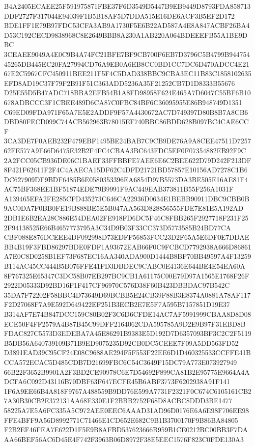 \documentclass[UTF8,fontset=fandol,zihao=-4,a4paper]{ctexart}
\begin{document}
{{B4A2405ECAEE25F591975871FBE37F6D3549D5447B9EB9449D8793FDA858713DDF2727F317044E94039F1B5B18AF5D7DDA515E16DE6ACF3B5EF2D172
BDE1FF1E79B97FDC53CFA3AB9A1730F5E6B22AD587A4E8A847ACBF26BA4D53C192CECD9838968C8E2649BBB8A230A1AB220A064BDEEEFB55A1BE9DBC
3CEAEE9049A4E0C9B4A74FC21BFE7BF9CB700F6EB7D3796C5B4799B94475445265DB445EC20FA27994CD76A9EB0A6EB8CC0BD1CC7DC6D470ADCC4E21
67E2C5967CFC450911BEE211F5F4C5DAD338BBC9CBA3EC11B83C1858102635EFD8AD19C37F79F2B91F51C363ADD5236A35F21252CB7D1D8333B55676
D25E55D5B47ADC718BBA2EFB54B1A8FD98958F624E465A7D6047C55BF6B10678ADBCCC3F1CBEE489D6CA87C0FBC84BF6C36095955E86B948749D1351
C69ED09FDA971F65A7E5E2ADDF9F57A4430672AC7D749397D80B8B7A8CB6DBD80FECD099C74ACB562963B78015EF740BBC86BDD628B097BC4CAE6CCF
3CA3DE7F0AEB232F479EBF1495BE24BAB7C9CB9DE76A9A8CEE47511D725762FE577A9E66D6475E32B2F4FC4CBAA3BC643FDC5EF0F07354882EB92F9C
2A2FCC05CB936DE06C1BAEF33FFBBFE7AEE6E6C2BEE622D79D242F213DF8F421F62611F2F4C4AAECA15DF62C4DFD21721BD57857E10156AD7278C1B6
DC627909DF9BDF6485B6E0580353396EA6854D97B5573DA3BE505E16AE81F4AC75BF368EE1BF51874EDE79B9991F9AC449EAB373811B55F256A1031F
A139465EFA2FE285CFD435273C646CA22936D0634E1BEBB90911DBC9CBB0B9AC0DA7F0BB0FE19B888BE5E5B047AA563D828856555FDE7E81E5A192AD
2DB1E6B2EA28C886E54DEA02FE918FD6DC5F46C8FBB265F2927718F231F252F94138525E66B4657773795A3C34D9B03F33CC373D5773585B24BD77CA
CBF088E876DCEEE4DF092998D73EDFF56853FCC23D2F65A5E6DF0E7DDAEBB4B19F3FBD86297BDE0FDF1A93672EAB66F0C9FCBCD7792938A666D86861
A7E0C8D0258B1EF73F687EC16AA340ADA900D1444B8BF70BB49597A4F13259B114AC45CC444B5B076FFE41FD3DBDEC9CABC0E4136E644BE4E54EA60A
8F767325E65347C3DC58B07EB297BC9CB1A61175C00E79D97A1565E1768F26F2922D05333D92BD16F1F417CF96970C576D38F60B423DBBDAC97B542C
35DA7F72202F58BBC4D73649D69BCBB5E24CB39F88B3E8374A0881A78AF117F2D27068F7A9E592D649422EF251B3ECB2E7E5F7A595B7157851D19E37
B314AF7E74B847DCC159C80B02F3C6D6CFDE14AC7AF5991999CBAA8D8D08ECE50F4FF2579A4B87B45C99DFF2164062CDA595785A9D2E9B97F31EBD8B
FDAC827C5573D3EDEBA7A45E86291B9383E5D192D7D6357093BF3C2C2F5119B5DB56A640739109B71B9ED9075235D92CB0DC5CEEE7F09A5DD563FD52
D3891EAD39C95CF24E08C9688AE294F5F553F22EE6D1D460325533CCFFE41BCCA572ECAC5D485CDB7D21699FBC6C54C3649F15DC79A773E073927949
66B22F3652B9901A2F3BD2CE90978C6E7D54692F899CA81B2E95775E9664A4ADCFA6C092D43116B70DBF63F647ECFE45B6ABF3773F6202938A91F141
1F6A9EE66B4A818F9767A488559B9DD76E599A7731F2321F0C674C6105161CB27A30B30CB2E372131AA68E330E1F2BBB2752F68D8ACBC8DDD3BE1477
58225A7E5A6FC335A5C972AEE0EEC6AAAD31AD96D0176E6A6E98F706EE98FFE4BFF9A56D8992771C71466E1CD652E682C9B1B3700170F9B86BA84805
F2B2EF46FEA7E622D1F5E9B8AFBD537623666B959B1CE0212BC00BB3F7DAAA66BEF56AC6D45E4F742F3963B06D8972F38E5EEC1576F823C0FDE130A3
}}
\end{document}
